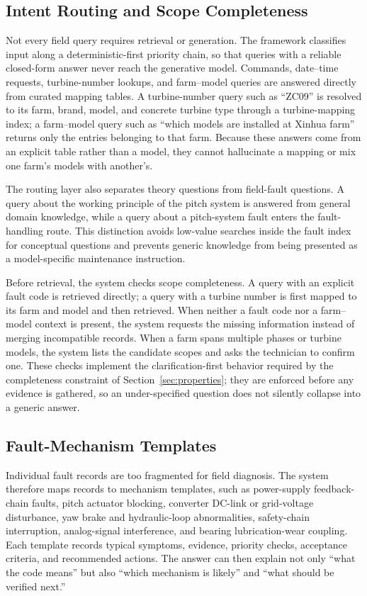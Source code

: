 \documentclass[lettersize,journal]{IEEEtran}
\begin{document}
\subsection{Intent Routing and Scope Completeness}
Not every field query requires retrieval or generation. The framework classifies input along a deterministic-first priority chain, so that queries with a reliable closed-form answer never reach the generative model. Commands, date--time requests, turbine-number lookups, and farm--model queries are answered directly from curated mapping tables. A turbine-number query such as ``ZC09'' is resolved to its farm, brand, model, and concrete turbine type through a turbine-mapping index; a farm--model query such as ``which models are installed at Xinhua farm'' returns only the entries belonging to that farm. Because these answers come from an explicit table rather than a model, they cannot hallucinate a mapping or mix one farm's models with another's.

The routing layer also separates theory questions from field-fault questions. A query about the working principle of the pitch system is answered from general domain knowledge, while a query about a pitch-system fault enters the fault-handling route. This distinction avoids low-value searches inside the fault index for conceptual questions and prevents generic knowledge from being presented as a model-specific maintenance instruction.

Before retrieval, the system checks scope completeness. A query with an explicit fault code is retrieved directly; a query with a turbine number is first mapped to its farm and model and then retrieved. When neither a fault code nor a farm--model context is present, the system requests the missing information instead of merging incompatible records. When a farm spans multiple phases or turbine models, the system lists the candidate scopes and asks the technician to confirm one. These checks implement the clarification-first behavior required by the completeness constraint of Section~\ref{sec:properties}; they are enforced before any evidence is gathered, so an under-specified question does not silently collapse into a generic answer.

\subsection{Fault-Mechanism Templates}
Individual fault records are too fragmented for field diagnosis. The system therefore maps records to mechanism templates, such as power-supply feedback-chain faults, pitch actuator blocking, converter DC-link or grid-voltage disturbance, yaw brake and hydraulic-loop abnormalities, safety-chain interruption, analog-signal interference, and bearing lubrication-wear coupling. Each template records typical symptoms, evidence, priority checks, acceptance criteria, and recommended actions. The answer can then explain not only ``what the code means'' but also ``which mechanism is likely'' and ``what should be verified next.''
\end{document}
